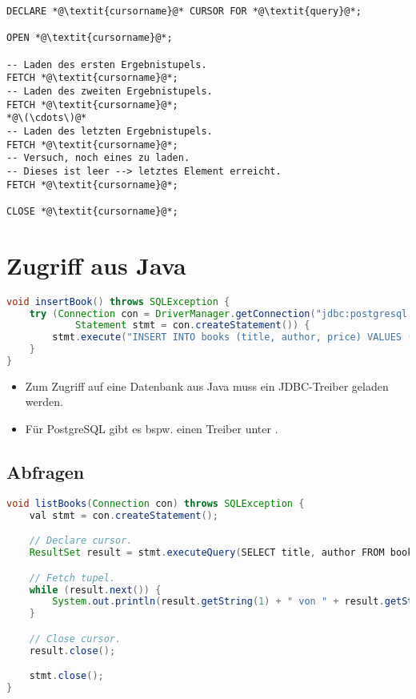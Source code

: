 		\begin{lstlisting}
DECLARE *@\textit{cursorname}@* CURSOR FOR *@\textit{query}@*;

OPEN *@\textit{cursorname}@*;

-- Laden des ersten Ergebnistupels.
FETCH *@\textit{cursorname}@*;
-- Laden des zweiten Ergebnistupels.
FETCH *@\textit{cursorname}@*;
*@\(\cdots\)@*
-- Laden des letzten Ergebnistupels.
FETCH *@\textit{cursorname}@*;
-- Versuch, noch eines zu laden.
-- Dieses ist leer --> letztes Element erreicht.
FETCH *@\textit{cursorname}@*;

CLOSE *@\textit{cursorname}@*;
    	\end{lstlisting}

	\section{Zugriff aus Java} %
		\begin{lstlisting}[language = Java]
void insertBook() throws SQLException {
	try (Connection con = DriverManager.getConnection("jdbc:postgresql://user:password@localhost:3306/library");
			Statement stmt = con.createStatement()) {
		stmt.execute("INSERT INTO books (title, author, price) VALUES ('Java ist auch eine Insel', 'Christian Ullenboom', 4990)");
	}
}
        \end{lstlisting}

		\begin{itemize}
			\item Zum Zugriff auf eine Datenbank aus Java muss ein JDBC-Treiber geladen werden.
			\item Für PostgreSQL gibt es bspw. einen Treiber unter .
		\end{itemize}

		\subsection{Abfragen} %
			\begin{lstlisting}[language = Java]
void listBooks(Connection con) throws SQLException {
	val stmt = con.createStatement();

	// Declare cursor.
	ResultSet result = stmt.executeQuery(SELECT title, author FROM books)

	// Fetch tupel.
	while (result.next()) {
		System.out.println(result.getString(1) + " von " + result.getString(2));
	}

	// Close cursor.
	result.close();

	stmt.close();
}
            \end{lstlisting}

